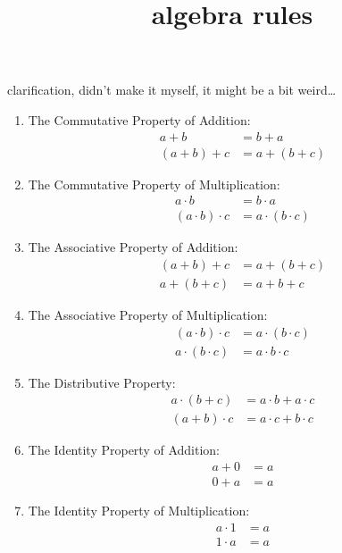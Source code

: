 \documentclass{article}
\title{algebra rules}
\begin{document}
\maketitle

clarification, didn't make it myself, it might be a bit weird\dots
\begin{enumerate}

\item The Commutative Property of Addition:
\begin{align*}
a + b &= b + a \\
(a + b) + c &= a + (b + c)
\end{align*}

\item The Commutative Property of Multiplication:
\begin{align*}
a \cdot b &= b \cdot a \\
(a \cdot b) \cdot c &= a \cdot (b \cdot c)
\end{align*}

\item The Associative Property of Addition:
\begin{align*}
(a + b) + c &= a + (b + c) \\
a + (b + c) &= a + b + c
\end{align*}

\item The Associative Property of Multiplication:
\begin{align*}
(a \cdot b) \cdot c &= a \cdot (b \cdot c) \\
a \cdot (b \cdot c) &= a \cdot b \cdot c
\end{align*}

\item The Distributive Property:
\begin{align*}
a \cdot (b + c) &= a \cdot b + a \cdot c \\
(a + b) \cdot c &= a \cdot c + b \cdot c
\end{align*}

\item The Identity Property of Addition:
\begin{align*}
a + 0 &= a \\
0 + a &= a
\end{align*}

\item The Identity Property of Multiplication:
\begin{align*}
a \cdot 1 &= a \\
1 \cdot a &= a
\end{align*}


\end{enumerate}
\end{document}
